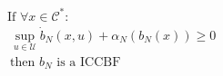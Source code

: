 \documentclass[preview]{standalone}
\begin{document}
\begin{align*}
&\text{If }\forall x \in \mathcal{C}^*:\\ &\ \sup_{u \in \mathcal{U}} \dot b_N(x, u) + \alpha_N(b_N(x)) \geq 0\\ & \ \text{then } b_N \text{ is a ICCBF}
\end{align*}
\end{document}

